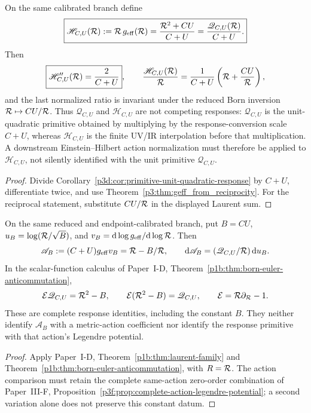 \documentclass[12pt,a4paper]{article}
\begin{document}
\begin{corollary}
\label{p3d:cor:two-scale-response-normalizations}
On the same calibrated branch define
\[
 \boxed{\mathscr H_{C,U}(\mathcal R):=\mathcal R\,g_{\rm eff}(\mathcal R)
 =\frac{\mathcal R^2+CU}{C+U}
 =\frac{\mathscr Q_{C,U}(\mathcal R)}{C+U}.}
\]
Then
\[
 \boxed{\mathscr H_{C,U}''(\mathcal R)=\frac{2}{C+U}},
 \qquad
 \frac{\mathscr H_{C,U}(\mathcal R)}{\mathcal R}
 =\frac1{C+U}\left(\mathcal R+\frac{CU}{\mathcal R}\right),
\]
and the last normalized ratio is invariant under the reduced Born inversion
\(\mathcal R\mapsto CU/\mathcal R\).
Thus \(\mathscr Q_{C,U}\) and \(\mathscr H_{C,U}\) are not competing
responses: \(\mathscr Q_{C,U}\) is the unit-quadratic primitive obtained by
multiplying by the response-conversion scale \(C+U\), whereas
\(\mathscr H_{C,U}\) is the finite UV/IR interpolation before that
multiplication.  A downstream Einstein--Hilbert action normalization must
therefore be applied to \(\mathscr H_{C,U}\), not silently identified with
the unit primitive \(\mathscr Q_{C,U}\).
\end{corollary}
\begin{proof}
Divide Corollary~\ref{p3d:cor:primitive-unit-quadratic-response} by
\(C+U\), differentiate twice, and use
Theorem~\ref{p3:thm:geff_from_reciprocity}.  For the reciprocal statement,
substitute \(CU/\mathcal R\) in the displayed Laurent sum.
\end{proof}

\begin{corollary}
\label{p3d:cor:born-euler-response-pair}
On the same reduced and endpoint-calibrated branch, put \(B=CU\),
\(u_B=\log(\mathcal R/\sqrt B)\), and
\(v_B=\mathrm d\log g_{\rm eff}/\mathrm d\log\mathcal R\). Then
\[
 \mathscr A_B:=(C+U)g_{\rm eff}v_B
   =\mathcal R-B/\mathcal R,\qquad
 \mathrm d\mathscr A_B=(\mathscr Q_{C,U}/\mathcal R)\,\mathrm du_B.
\]
In the scalar-function calculus of Paper~I-D,
Theorem~\ref{p1b:thm:born-euler-anticommutation},
\[
 \mathcal E\mathscr Q_{C,U}=\mathcal R^2-B,\qquad
 \mathcal E(\mathcal R^2-B)=\mathscr Q_{C,U},\qquad
 \mathcal E=\mathcal R\partial_{\mathcal R}-1.
\]
These are complete response identities, including the constant \(B\).
They neither identify \(\mathscr A_B\) with a metric-action coefficient nor
identify the response primitive with that action's Legendre potential.
\end{corollary}
\begin{proof}
Apply Paper~I-D, Theorem~\ref{p1b:thm:laurent-family} and
Theorem~\ref{p1b:thm:born-euler-anticommutation}, with \(R=\mathcal R\).
The action comparison must retain the complete same-action zero-order
combination of Paper~III-F,
Proposition~\ref{p3f:prop:complete-action-legendre-potential}; a second
variation alone does not preserve this constant datum.
\end{proof}
\end{document}

